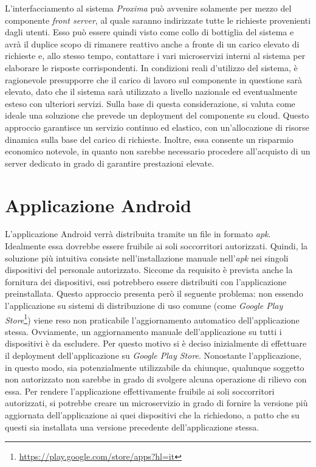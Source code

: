 \documentclass[a4paper,12pt]{report}
\begin{document}
L'interfacciamento al sistema \emph{Proxima} può avvenire solamente per mezzo del componente \emph{front server}, al quale saranno indirizzate tutte le richieste provenienti dagli utenti. Esso può essere quindi visto come collo di bottiglia del sistema e avrà il duplice scopo di rimanere reattivo anche a fronte di un carico elevato di richieste e, allo stesso tempo, contattare i vari microservizi interni al sistema per elaborare le risposte corrispondenti. In condizioni reali d'utilizzo del sistema, è ragionevole presupporre che il carico di lavoro sul componente in questione sarà elevato, dato che il sistema sarà utilizzato a livello nazionale ed eventualmente esteso con ulteriori servizi. Sulla base di questa considerazione, si valuta come ideale una soluzione che prevede un deployment del componente su cloud. Questo approccio garantisce un servizio continuo ed elastico, con un'allocazione di risorse dinamica sulla base del carico di richieste. Inoltre, essa consente un risparmio economico notevole, in quanto non sarebbe necessario procedere all'acquisto di un server dedicato in grado di garantire prestazioni elevate.

\section{Applicazione Android}

L'applicazione Android verrà distribuita tramite un file in formato \emph{apk}. Idealmente essa dovrebbe essere fruibile ai soli soccorritori autorizzati. Quindi, la soluzione più intuitiva consiste nell'installazione manuale nell'\emph{apk} nei singoli dispositivi del personale autorizzato. Siccome da requisito è prevista anche la fornitura dei dispositivi, essi potrebbero essere distribuiti con l'applicazione preinstallata. Questo approccio presenta però il seguente problema: non essendo l'applicazione su sistemi di distribuzione di uso comune (come \emph{Google Play Store}\footnote{\url{https://play.google.com/store/apps?hl=it}}) viene reso non praticabile l'aggiornamento automatico dell'applicazione stessa.
Ovviamente, un aggiornamento manuale dell'applicazione su tutti i dispositivi è da escludere. Per questo motivo si è deciso inizialmente di effettuare il deployment dell'applicazione su \emph{Google Play Store}. Nonostante l'applicazione, in questo modo, sia potenzialmente utilizzabile da chiunque, qualunque soggetto non autorizzato non sarebbe in grado di svolgere alcuna operazione di rilievo con essa. Per rendere l'applicazione effettivamente fruibile ai soli soccorritori autorizzati, si potrebbe creare un microservizio in grado di fornire la versione più aggiornata dell'applicazione ai quei dispositivi che la richiedono, a patto che su questi sia installata una versione precedente dell'applicazione stessa.
\end{document}
